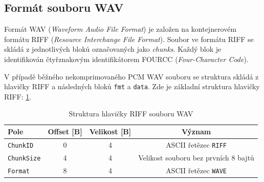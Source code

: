 \documentclass[12pt, a4paper]{article}
\begin{document}



\subsection{Formát souboru WAV}

Formát WAV (\textit{Waveform Audio File Format}) je založen na kontejnerovém
formátu RIFF (\textit{Resource Interchange File Format}). Soubor ve formátu
RIFF se skládá z jednotlivých bloků označovaných jako \textit{chunks}.
Každý blok je identifikován čtyřznakovým identifikátorem FOURCC
(\textit{Four-Character Code}).

V případě běžného nekomprimovaného PCM WAV souboru se struktura skládá
z hlavičky RIFF a následných bloků \texttt{fmt} a \texttt{data}.
Zde je základní struktura hlavičky RIFF:
\ref{tab:wav_riff_header}.

\begin{table}[ht]
    \centering
    \caption{Struktura hlavičky RIFF souboru WAV}
    \label{tab:wav_riff_header}
    \begin{tabular}{lccc}
        \toprule
        \textbf{Pole} & \textbf{Offset [B]} & \textbf{Velikost [B]} & \textbf{Význam} \\
        \midrule
        \texttt{ChunkID}   & 0 & 4 & ASCII řetězec \texttt{RIFF} \\
        \texttt{ChunkSize} & 4 & 4 & Velikost souboru bez prvních 8 bajtů \\
        \texttt{Format}    & 8 & 4 & ASCII řetězec \texttt{WAVE} \\
        \bottomrule
    \end{tabular}
\end{table}
\end{document}
